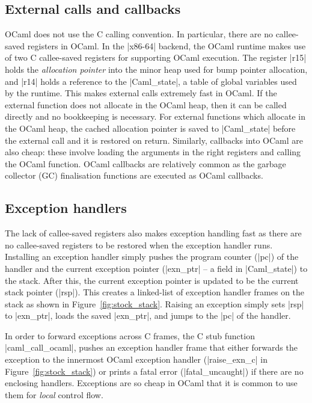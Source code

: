 \documentclass[sigplan,10pt,review,anonymous]{acmart}\settopmatter{printfolios=true,printccs=false,printacmref=false}
\begin{document}
\subsection{External calls and callbacks}
\label{sec:external}

OCaml does not use the C calling convention. In particular, there are no
callee-saved registers in OCaml. In the |x86-64| backend, the OCaml runtime
makes use of two C callee-saved registers for supporting OCaml execution. The
register |r15| holds the \emph{allocation pointer} into the minor heap used for
bump pointer allocation, and |r14| holds a reference to the |Caml_state|, a
table of global variables used by the runtime. This makes external calls
extremely fast in OCaml. If the external function does not allocate in the
OCaml heap, then it can be called directly and no bookkeeping is necessary. For
external functions which allocate in the OCaml heap, the cached allocation
pointer is saved to |Caml_state| before the external call and it is restored on
return. Similarly, callbacks into OCaml are also cheap: these involve loading
the arguments in the right registers and calling the OCaml function. OCaml
callbacks are relatively common as the garbage collector (GC) finalisation
functions are executed as OCaml callbacks.

\subsection{Exception handlers}
\label{sec:exn_handlers}

The lack of callee-saved registers also makes exception handling fast as there
are no callee-saved registers to be restored when the exception handler runs.
Installing an exception handler simply pushes the program counter (|pc|) of the
handler and the current exception pointer (|exn_ptr| -- a field in
|Caml_state|) to the stack. After this, the current exception pointer is
updated to be the current stack pointer (|rsp|). This creates a linked-list of
exception handler frames on the stack as shown in Figure~\ref{fig:stock_stack}.
Raising an exception simply sets |rsp| to |exn_ptr|, loads the saved |exn_ptr|,
and jumps to the |pc| of the handler.


In order to forward exceptions across C frames, the C stub function
|caml_call_ocaml|, pushes an exception handler frame that either forwards the
exception to the innermost OCaml exception handler (|raise_exn_c| in
Figure~\ref{fig:stock_stack}) or prints a fatal error (|fatal_uncaught|) if
there are no enclosing handlers. Exceptions are so cheap in OCaml that it is
common to use them for \emph{local} control flow.
\end{document}
